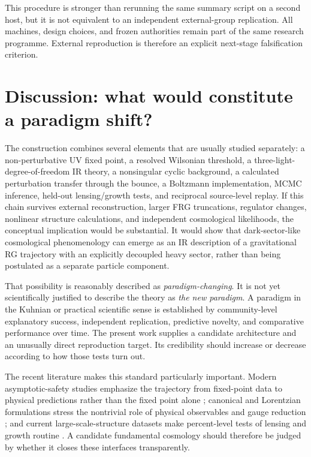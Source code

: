 \documentclass[12pt]{iopart}
\begin{document}
This procedure is stronger than rerunning the same summary script on a second host, but it is not equivalent to an independent external-group replication.  All machines, design choices, and frozen authorities remain part of the same research programme.  External reproduction is therefore an explicit next-stage falsification criterion.

\section{Discussion: what would constitute a paradigm shift?}
\label{sec:discussion}

The construction combines several elements that are usually studied separately: a non-perturbative UV fixed point, a resolved Wilsonian threshold, a three-light-degree-of-freedom IR theory, a nonsingular cyclic background, a calculated perturbation transfer through the bounce, a Boltzmann implementation, MCMC inference, held-out lensing/growth tests, and reciprocal source-level replay.  If this chain survives external reconstruction, larger FRG truncations, regulator changes, nonlinear structure calculations, and independent cosmological likelihoods, the conceptual implication would be substantial.  It would show that dark-sector-like cosmological phenomenology can emerge as an IR description of a gravitational RG trajectory with an explicitly decoupled heavy sector, rather than being postulated as a separate particle component.

That possibility is reasonably described as \emph{paradigm-changing}.  It is not yet scientifically justified to describe the theory as \emph{the new paradigm}.  A paradigm in the Kuhnian or practical scientific sense is established by community-level explanatory success, independent replication, predictive novelty, and comparative performance over time.  The present work supplies a candidate architecture and an unusually direct reproduction target.  Its credibility should increase or decrease according to how those tests turn out.

The recent literature makes this standard particularly important.  Modern asymptotic-safety studies emphasize the trajectory from fixed-point data to physical predictions rather than the fixed point alone \cite{SaueressigSilva2024}; canonical and Lorentzian formulations stress the nontrivial role of physical observables and gauge reduction \cite{DAngelo2024,Thiemann2024}; and current large-scale-structure datasets make percent-level tests of lensing and growth routine \cite{DESI2024BAO,DESI2025DR2BAO,MadhavacherilACT2023,DalalHSC2023}.  A candidate fundamental cosmology should therefore be judged by whether it closes these interfaces transparently.
\end{document}
